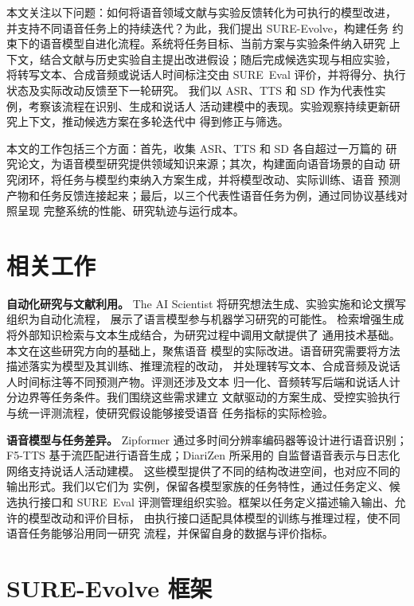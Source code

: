 \documentclass{article}
\begin{document}
本文关注以下问题：如何将语音领域文献与实验反馈转化为可执行的模型改进，
并支持不同语音任务上的持续迭代？为此，我们提出 SURE-Evolve，构建任务
约束下的语音模型自进化流程。系统将任务目标、当前方案与实验条件纳入研究
上下文，结合文献与历史实验自主提出改进假设；随后完成候选实现与相应实验，
将转写文本、合成音频或说话人时间标注交由
SURE~Eval 评价，并将得分、执行状态及实际改动反馈至下一轮研究。
我们以 ASR、TTS 和 SD 作为代表性实例，考察该流程在识别、生成和说话人
活动建模中的表现。实验观察持续更新研究上下文，推动候选方案在多轮迭代中
得到修正与筛选。

本文的工作包括三个方面：首先，收集 ASR、TTS 和 SD 各自超过一万篇的
研究论文，为语音模型研究提供领域知识来源；其次，构建面向语音场景的自动
研究闭环，将任务与模型约束纳入方案生成，并将模型改动、实际训练、语音
预测产物和任务反馈连接起来；最后，以三个代表性语音任务为例，通过同协议基线对照呈现
完整系统的性能、研究轨迹与运行成本。

\section{相关工作}
\label{sec:related}

\textbf{自动化研究与文献利用。}
The AI Scientist 将研究想法生成、实验实施和论文撰写组织为自动化流程，
展示了语言模型参与机器学习研究的可能性\cite{lu2024aiscientist}。
检索增强生成将外部知识检索与文本生成结合，为研究过程中调用文献提供了
通用技术基础\cite{lewis2020rag}。本文在这些研究方向的基础上，聚焦语音
模型的实际改进。语音研究需要将方法描述落实为模型及其训练、推理流程的改动，
并处理转写文本、合成音频及说话人时间标注等不同预测产物。评测还涉及文本
归一化、音频转写后端和说话人计分边界等任务条件。我们围绕这些需求建立
文献驱动的方案生成、受控实验执行与统一评测流程，使研究假设能够接受语音
任务指标的实际检验。

\textbf{语音模型与任务差异。}
Zipformer 通过多时间分辨率编码器等设计进行语音识别\cite{yao2024zipformer}；
F5-TTS 基于流匹配进行语音生成\cite{chen2024f5tts}；DiariZen 所采用的
自监督语音表示与日志化网络支持说话人活动建模\cite{han2025leveraging}。
这些模型提供了不同的结构改进空间，也对应不同的输出形式。我们以它们为
实例，保留各模型家族的任务特性，通过任务定义、候选执行接口和 SURE~Eval
评测管理组织实验。框架以任务定义描述输入输出、允许的模型改动和评价目标，
由执行接口适配具体模型的训练与推理过程，使不同语音任务能够沿用同一研究
流程，并保留自身的数据与评价指标。

\section{SURE-Evolve 框架}
\label{sec:method}
\end{document}
